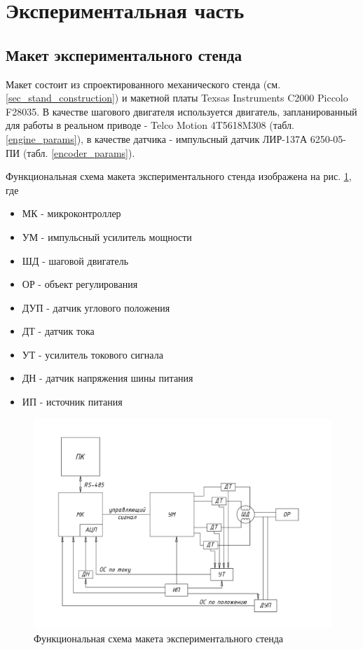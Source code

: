 \newpage
\section{Экспериментальная часть}
\subsection{Макет экспериментального стенда}

Макет состоит из спроектированного механического стенда (см. \ref{sec_stand_construction})
и макетной платы Texsas Instruments C2000 Piccolo F28035. В качестве шагового двигателя
используется двигатель, запланированный для работы в реальном приводе - Telco
Motion 4T5618M308 (табл. \ref{engine_params}), в качестве датчика
- импульсный датчик ЛИР-137А 6250-05-ПИ (табл. \ref{encoder_params}).

Функциональная схема макета экспериментального стенда изображена на рис.
\ref{pic_experim_stand_functional_scheme}, где

\begin{itemize}
    \item МК - микроконтроллер
    \item УМ - импульсный усилитель мощности
    \item ШД - шаговой двигатель
    \item ОР - объект регулирования
    \item ДУП - датчик углового положения
    \item ДТ - датчик тока
    \item УТ - усилитель токового сигнала
    \item ДН - датчик напряжения шины питания
    \item ИП - источник питания
\end{itemize}

\begin{figure}
    \centering
    \includegraphics[width=\linewidth, keepaspectratio,
                    clip=true, trim=41mm 31mm 41mm 30mm]
                    {./src/pictures/experim_stand_functional_scheme}
    \caption{Функциональная схема макета экспериментального стенда}
    \label{pic_experim_stand_functional_scheme}
\end{figure}

